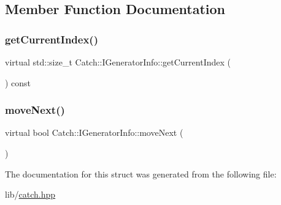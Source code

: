 \subsection{Member Function Documentation}
\hypertarget{struct_catch_1_1_i_generator_info_a6a0dca712d31f6849fd9447b1344673a}{}\label{struct_catch_1_1_i_generator_info_a6a0dca712d31f6849fd9447b1344673a} 
\subsubsection{\texorpdfstring{get\+Current\+Index()}{getCurrentIndex()}}
{\footnotesize\ttfamily virtual std\+::size\+\_\+t Catch\+::\+I\+Generator\+Info\+::get\+Current\+Index (\begin{DoxyParamCaption}{ }\end{DoxyParamCaption}) const\hspace{0.3cm}{\ttfamily [pure virtual]}}

\hypertarget{struct_catch_1_1_i_generator_info_a2b86711ca7009903edfe27ed62b515ef}{}\label{struct_catch_1_1_i_generator_info_a2b86711ca7009903edfe27ed62b515ef} 
\subsubsection{\texorpdfstring{move\+Next()}{moveNext()}}
{\footnotesize\ttfamily virtual bool Catch\+::\+I\+Generator\+Info\+::move\+Next (\begin{DoxyParamCaption}{ }\end{DoxyParamCaption})\hspace{0.3cm}{\ttfamily [pure virtual]}}



The documentation for this struct was generated from the following file\+:\begin{DoxyCompactItemize}
\item 
lib/\hyperlink{catch_8hpp}{catch.\+hpp}\end{DoxyCompactItemize}
